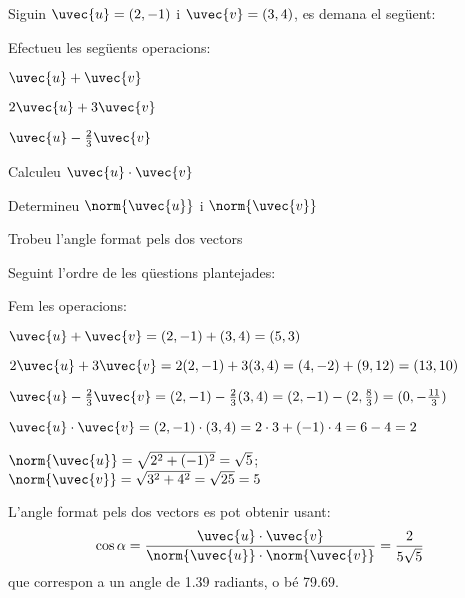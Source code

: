   \Exercise Siguin $\uvec{u}=(2,-1)$ i $\uvec{v}=(3,4)$, es demana el següent:
  \begin{llista}
    \item Efectueu les següents operacions:
    \begin{llista}
      \item $\uvec{u}+\uvec{v}$
      \item $2\uvec{u}+3\uvec{v}$
      \item $\uvec{u}-\frac{2}{3}\uvec{v}$
    \end{llista}
    \item Calculeu $\uvec{u}\cdot \uvec{v}$
    \item Determineu $\norm{\uvec{u}}$ i $\norm{\uvec{v}}$
    \item Trobeu l'angle format pels dos vectors
  \end{llista}

  \Answer Seguint l'ordre de les qüestions plantejades:
  \begin{llista}
    \item Fem les operacions:
    \begin{llista}
      \item $\uvec{u}+\uvec{v}=(2,-1)+(3,4)=(5,3)$
      \item $2\uvec{u}+3\uvec{v}=2(2,-1)+3(3,4)=(4,-2)+(9,12)=(13,10)$
      \item $\uvec{u}-\frac{2}{3}\uvec{v}=(2,-1)-\frac{2}{3}(3,4)=(2,-1)-(2,\frac{8}{3})=(0,-\frac{11}{3})$
    \end{llista}
    \item $\uvec{u}\cdot \uvec{v}=(2,-1)\cdot(3,4)=2\cdot3+(-1)\cdot4=6-4=2$
    \item $\norm{\uvec{u}}=\sqrt{2^2+(-1)^2}=\sqrt{5}$; $\norm{\uvec{v}}=\sqrt{3^2+4^2}=\sqrt{25}=5$
    \item L'angle format pels dos vectors es pot obtenir usant:
    \[\cos{\alpha}=\frac{\uvec{u}\cdot \uvec{v}}{\norm{\uvec{u}} \cdot \norm{\uvec{v}}}=\frac{2}{5\sqrt{5}}
    \]
    que correspon a un angle de 1.39 radiants, o bé 79.69\degree.
  \end{llista}
  \blacksquare
